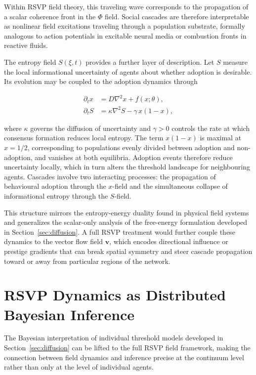 \documentclass[12pt,a4paper]{article}
\theoremstyle{plain}
\theoremstyle{definition}
\begin{document}
Within RSVP field theory, this traveling wave corresponds to the propagation of a scalar coherence front in the $\Phi$ field. Social cascades are therefore interpretable as nonlinear field excitations traveling through a population substrate, formally analogous to action potentials in excitable neural media or combustion fronts in reactive fluids.

The entropy field $S(\xi,t)$ provides a further layer of description. Let $S$ measure the local informational uncertainty of agents about whether adoption is desirable. Its evolution may be coupled to the adoption dynamics through

\begin{align}
\partial_t x &= D\nabla^2 x + f(x;\theta), \\
\partial_t S &= \kappa \nabla^2 S - \gamma\, x(1-x),
\end{align}

where $\kappa$ governs the diffusion of uncertainty and $\gamma > 0$ controls the rate at which consensus formation reduces local entropy. The term $x(1-x)$ is maximal at $x = 1/2$, corresponding to populations evenly divided between adoption and non-adoption, and vanishes at both equilibria. Adoption events therefore reduce uncertainty locally, which in turn alters the threshold landscape for neighbouring agents. Cascades involve two interacting processes: the propagation of behavioural adoption through the $x$-field and the simultaneous collapse of informational entropy through the $S$-field.

This structure mirrors the entropy-energy duality found in physical field systems and generalizes the scalar-only analysis of the free-energy formulation developed in Section~\ref{sec:diffusion}. A full RSVP treatment would further couple these dynamics to the vector flow field $\mathbf{v}$, which encodes directional influence or prestige gradients that can break spatial symmetry and steer cascade propagation toward or away from particular regions of the network.

\section{RSVP Dynamics as Distributed Bayesian Inference}
\label{sec:rsvpbayes}

The Bayesian interpretation of individual threshold models developed in Section~\ref{sec:diffusion} can be lifted to the full RSVP field framework, making the connection between field dynamics and inference precise at the continuum level rather than only at the level of individual agents.
\end{document}
